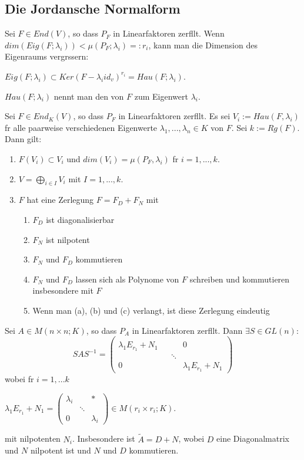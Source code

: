 \documentclass[11pt, a4paper]{article}
\begin{document}
\subsection{Die Jordansche Normalform}
\begin{definition}
Sei $F \in End(V)$, so dass $P_F$ in Linearfaktoren zerf\aee llt. Wenn $dim(Eig(F; \lambda_i)) < \mu (P_F; \lambda_i) =: r_i$, kann man die Dimension des Eigenraums vergr\oee ssern: 
\\ \centerline{$Eig(F; \lambda_i) \subset Ker(F - \lambda_i id_v)^{r_i} = Hau(F; \lambda_i)$. }
$Hau(F; \lambda_i)$ nennt man den  von $F$ zum Eigenwert $\lambda_i$.
\end{definition}
\begin{theorem} 
Sei $F \in End_K(V)$, so dass $P_F$ in Linearfaktoren zerf\aee llt. Es sei $V_i := Hau(F, \lambda_i)$ f\uee r alle paarweise verschiedenen Eigenwerte $\lambda_1, ... , \lambda_n \in K$ von $F$. Sei $k := Rg(F)$. Dann gilt:
\begin{enumerate}
\item $F(V_i) \subset V_i$ und $dim(V_i) = \mu (P_F, \lambda_i)$ f\uee r $i = 1, ..., k$. 
\item $V =\bigoplus\limits_{i \in I} V_i$ mit $I=1, ..., k$.
\item $F$ hat eine Zerlegung $F = F_D + F_N$ mit
\begin{enumerate}
\item $F_D$ ist diagonalisierbar
\item$ F_N$ ist nilpotent
\item $F_N$ und $F_D$ kommutieren
\item $F_N$ und $F_D$ lassen sich als Polynome von $F$ schreiben und kommutieren insbesondere mit $F$
\item Wenn man (a), (b) und (c) verlangt, ist diese Zerlegung eindeutig
\end{enumerate}
\end{enumerate}
\end{theorem}

\begin{corollary}
Sei $A \in M(n \times n; K)$, so dass $P_A$ in Linearfaktoren zerf\aee llt. Dann $\exists S \in GL(n)$: 
$$
S A S^{-1}=\left(\begin{array}{cccc}{} & {} & {} & {} 
\\ {\lambda_{1} E_{r_{1}}+N_{1}} & {} & {} & {0} 
\\ {} & {} & {\ddots} & {} 
\\ {0} & {} & {} & {\lambda_{1} E_{r_{1}}+N_{1}} 
\end{array}\right)
$$
wobei f\uee r $i = 1, ... k$
\\ \centerline{$
\lambda_{1} E_{r_{1}}+N_{1} = 
\left(\begin{array}{ccc}
{\lambda_{i}} & {} & {*} 
\\ {} & {\ddots} & {} 
\\ {0} & {} & {\lambda_{i}}\end{array}\right) \in M(r_i \times r_i; K)$.}
mit nilpotenten $N_i$. Insbesondere ist $\tilde{A} = D + N$, wobei $D$ eine Diagonalmatrix und $N$ nilpotent ist und $N$ und $D$ kommutieren.
\end{corollary}
\end{document}
